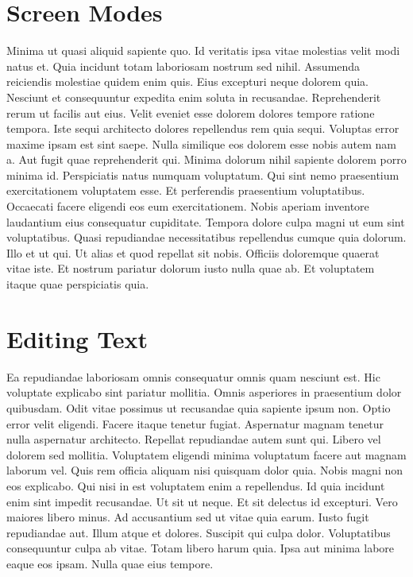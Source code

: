 
\chapter*{Screen Modes}

Minima ut quasi aliquid sapiente quo. Id veritatis ipsa vitae molestias velit
modi natus et. Quia incidunt totam laboriosam nostrum sed nihil. Assumenda
reiciendis molestiae quidem enim quis. Eius excepturi neque dolorem quia.
Nesciunt et consequuntur expedita enim soluta in recusandae. Reprehenderit
rerum ut facilis aut eius. Velit eveniet esse dolorem dolores tempore ratione
tempora. Iste sequi architecto dolores repellendus rem quia sequi. Voluptas
error maxime ipsam est sint saepe. Nulla similique eos dolorem esse nobis autem
nam a. Aut fugit quae reprehenderit qui. Minima dolorum nihil sapiente dolorem
porro minima id. Perspiciatis natus numquam voluptatum. Qui sint nemo
praesentium exercitationem voluptatem esse. Et perferendis praesentium
voluptatibus. Occaecati facere eligendi eos eum exercitationem. Nobis aperiam
inventore laudantium eius consequatur cupiditate. Tempora dolore culpa magni ut
eum sint voluptatibus. Quasi repudiandae necessitatibus repellendus cumque quia
dolorum. Illo et ut qui. Ut alias et quod repellat sit nobis. Officiis
doloremque quaerat vitae iste. Et nostrum pariatur dolorum iusto nulla quae ab.
Et voluptatem itaque quae perspiciatis quia.


\chapter*{Editing Text}

Ea repudiandae laboriosam omnis consequatur omnis quam nesciunt est. Hic
voluptate explicabo sint pariatur mollitia. Omnis asperiores in praesentium
dolor quibusdam. Odit vitae possimus ut recusandae quia sapiente ipsum non.
Optio error velit eligendi. Facere itaque tenetur fugiat. Aspernatur magnam
tenetur nulla aspernatur architecto. Repellat repudiandae autem sunt qui.
Libero vel dolorem sed mollitia. Voluptatem eligendi minima voluptatum facere
aut magnam laborum vel. Quis rem officia aliquam nisi quisquam dolor quia.
Nobis magni non eos explicabo. Qui nisi in est voluptatem enim a repellendus.
Id quia incidunt enim sint impedit recusandae. Ut sit ut neque. Et sit delectus
id excepturi. Vero maiores libero minus. Ad accusantium sed ut vitae quia
earum. Iusto fugit repudiandae aut. Illum atque et dolores. Suscipit qui culpa
dolor. Voluptatibus consequuntur culpa ab vitae. Totam libero harum quia. Ipsa
aut minima labore eaque eos ipsam. Nulla quae eius tempore.

\@openrighttrue\makeatother
